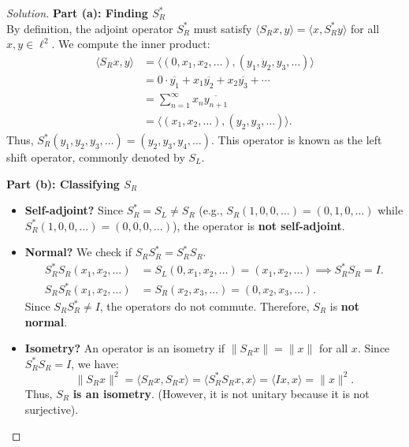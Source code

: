 \documentclass{article}
\begin{document}
\begin{proof}[Solution]
    \textbf{Part (a): Finding $S_R^*$} \\
    By definition, the adjoint operator $S_R^*$ must satisfy $\langle S_R x, y \rangle = \langle x, S_R^* y \rangle$ for all $x, y \in \ell^2$. We compute the inner product:
    \begin{align*}
        \langle S_R x, y \rangle &= \langle (0, x_1, x_2, \ldots), (y_1, y_2, y_3, \ldots) \rangle \\
        &= 0 \cdot \overline{y_1} + x_1 \overline{y_2} + x_2 \overline{y_3} + \cdots \\
        &= \sum_{n=1}^\infty x_n \overline{y_{n+1}} \\
        &= \langle (x_1, x_2, \ldots), (y_2, y_3, \ldots) \rangle.
    \end{align*}
    Thus, $S_R^*(y_1, y_2, y_3, \ldots) = (y_2, y_3, y_4, \ldots)$. This operator is known as the left shift operator, commonly denoted by $S_L$.
    
    \vspace{1em}
    \textbf{Part (b): Classifying $S_R$} \\
    \begin{itemize}
        \item \textbf{Self-adjoint?} 
        Since $S_R^* = S_L \neq S_R$ (e.g., $S_R(1,0,0,\ldots) = (0,1,0,\ldots)$ while $S_R^*(1,0,0,\ldots) = (0,0,0,\ldots)$), the operator is \textbf{not self-adjoint}.
        
        \item \textbf{Normal?}
        We check if $S_R S_R^* = S_R^* S_R$.
        \begin{align*}
            S_R^* S_R (x_1, x_2, \ldots) &= S_L (0, x_1, x_2, \ldots) = (x_1, x_2, \ldots) \implies S_R^* S_R = I. \\
            S_R S_R^* (x_1, x_2, \ldots) &= S_R (x_2, x_3, \ldots) = (0, x_2, x_3, \ldots).
        \end{align*}
        Since $S_R S_R^* \neq I$, the operators do not commute. Therefore, $S_R$ is \textbf{not normal}.
        
        \item \textbf{Isometry?}
        An operator is an isometry if $\|S_R x\| = \|x\|$ for all $x$. Since $S_R^* S_R = I$, we have:
        \[ \|S_R x\|^2 = \langle S_R x, S_R x \rangle = \langle S_R^* S_R x, x \rangle = \langle Ix, x \rangle = \|x\|^2. \]
        Thus, $S_R$ \textbf{is an isometry}. (However, it is not unitary because it is not surjective).
    \end{itemize}
\end{proof}
\end{document}
